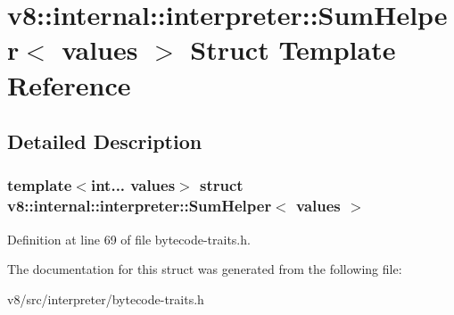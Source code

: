 \hypertarget{structv8_1_1internal_1_1interpreter_1_1SumHelper}{}\section{v8\+:\+:internal\+:\+:interpreter\+:\+:Sum\+Helper$<$ values $>$ Struct Template Reference}
\label{structv8_1_1internal_1_1interpreter_1_1SumHelper}


\subsection{Detailed Description}
\subsubsection*{template$<$int... values$>$\newline
struct v8\+::internal\+::interpreter\+::\+Sum\+Helper$<$ values $>$}



Definition at line 69 of file bytecode-\/traits.\+h.



The documentation for this struct was generated from the following file\+:\begin{DoxyCompactItemize}
\item 
v8/src/interpreter/bytecode-\/traits.\+h\end{DoxyCompactItemize}
